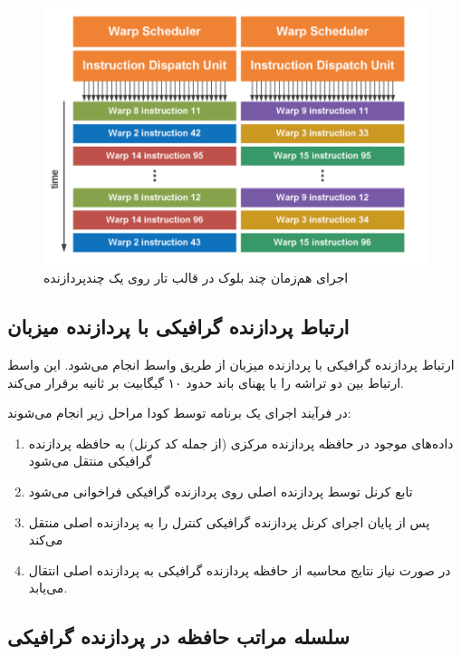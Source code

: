 \documentclass{thesis}
\begin{document}
\begin{figure}[h]
\centering
\includegraphics[width=\textwidth]{./pics/9}
\caption{%
اجرای هم‌زمان چند بلوک در قالب تار‌ روی یک چندپردازنده
}
\label{warpschedule}
\end{figure}

\subsection{ارتباط پردازنده گرافیکی با پردازنده میزبان}

ارتباط پردازنده گرافیکی با پردازنده میزبان از طریق واسط
انجام می‌شود. این واسط ارتباط بین دو تراشه را با پهنای باند حدود ۱۰ گیگابیت بر ثانیه برقرار می‌کند.

در فرآیند اجرای یک برنامه توسط کودا مراحل زیر انجام می‌شوند:
\begin{enumerate}
\item
داده‌های موجود در حافظه پردازنده مرکزی (از جمله کد کرنل) به حافظه پردازنده گرافیکی منتقل می‌شود
\item
تابع کرنل توسط پردازنده اصلی روی پردازنده گرافیکی فراخوانی می‌شود
\item
پس از پایان اجرای کرنل پردازنده گرافیکی کنترل را به پردازنده اصلی منتقل می‌کند
\item
در صورت نیاز نتایج محاسبه از حافظه پردازنده گرافیکی به پردازنده اصلی انتقال می‌یابد.
\end{enumerate}

\subsection{
سلسله مراتب حافظه در پردازنده گرافیکی
}
\end{document}
